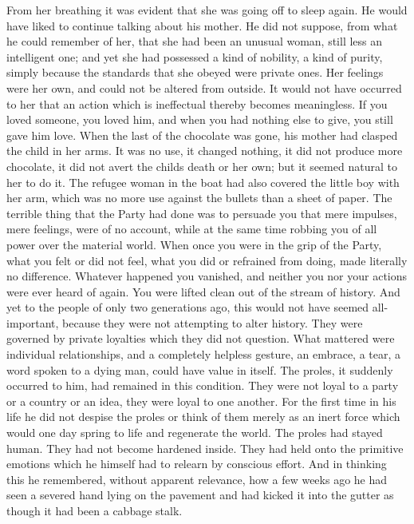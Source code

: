 \begin{paracol}{2}
From her breathing it was evident that she was going off to sleep again.
He would have liked to continue talking about his mother. He did not
suppose, from what he could remember of her, that she had been an
unusual woman, still less an intelligent one; and yet she had possessed
a kind of nobility, a kind of purity, simply because the standards that
she obeyed were private ones. Her feelings were her own, and could not
be altered from outside. It would not have occurred to her that an
action which is ineffectual thereby becomes meaningless. If you loved
someone, you loved him, and when you had nothing else to give, you still
gave him love. When the last of the chocolate was gone, his mother had
clasped the child in her arms. It was no use, it changed nothing, it did
not produce more chocolate, it did not avert the child\textquotesingle s
death or her own; but it seemed natural to her to do it. The refugee
woman in the boat had also covered the little boy with her arm, which
was no more use against the bullets than a sheet of paper. The terrible
thing that the Party had done was to persuade you that mere impulses,
mere feelings, were of no account, while at the same time robbing you of
all power over the material world. When once you were in the grip of the
Party, what you felt or did not feel, what you did or refrained from
doing, made literally no difference. Whatever happened you vanished, and
neither you nor your actions were ever heard of again. You were lifted
clean out of the stream of history. And yet to the people of only two
generations ago, this would not have seemed all-important, because they
were not attempting to alter history. They were governed by private
loyalties which they did not question. What mattered were individual
relationships, and a completely helpless gesture, an embrace, a tear, a
word spoken to a dying man, could have value in itself. The proles, it
suddenly occurred to him, had remained in this condition. They were not
loyal to a party or a country or an idea, they were loyal to one
another. For the first time in his life he did not despise the proles or
think of them merely as an inert force which would one day spring to
life and regenerate the world. The proles had stayed human. They had not
become hardened inside. They had held onto the primitive emotions which
he himself had to relearn by conscious effort. And in thinking this he
remembered, without apparent relevance, how a few weeks ago he had seen
a severed hand lying on the pavement and had kicked it into the gutter
as though it had been a cabbage stalk.


\end{paracol}
